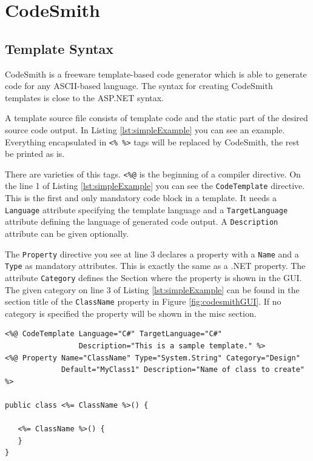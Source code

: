 \chapter{CodeSmith}
\label{cha:codeSmith}


\section{Template Syntax}
CodeSmith is a freeware template-based code generator which is able to 
generate code for any ASCII-based language. The syntax for creating 
CodeSmith templates is close to the ASP.NET syntax.

A template source file consists of template code and the static part of the 
desired source code output. In Listing \ref{lst:simpleExample} you can see 
an example. Everything encapsulated in \verb~<% %>~ tags will be 
replaced by CodeSmith, the rest be printed as is.

There are varieties of this tags. \verb~<%@~ is the beginning of a 
compiler directive. On the line 1 of Listing \ref{lst:simpleExample} you 
can see the \verb~CodeTemplate~ directive. This is the first and only 
mandatory code block in a template. It needs a \verb~Language~ attribute 
specifying the template language and a \verb~TargetLanguage~ attribute 
defining the language of generated code output. A \verb~Description~ 
attribute can be given optionally.

The \verb~Property~ directive you see at line 3 declares a property 
with a \verb~Name~ and a \verb~Type~ as mandatory attributes. This is exactly 
the same as a .NET property. The attribute \verb~Category~ defines
the Section where the property is shown in the GUI. The given category on 
line 3 of Listing \ref{lst:simpleExample} can be found in the section title 
of the \verb~ClassName~ property in Figure \ref{fig:codesmithGUI}. If no 
category is specified the property will be shown in the misc section.

\begin{lstlisting}[float,caption=Simple Example,label=lst:simpleExample]
<%@ CodeTemplate Language="C#" TargetLanguage="C#"
                 Description="This is a sample template." %>
<%@ Property Name="ClassName" Type="System.String" Category="Design"
             Default="MyClass1" Description="Name of class to create" %>

public class <%= ClassName %>() {

   <%= ClassName %>() {
   }
}
\end{lstlisting}

